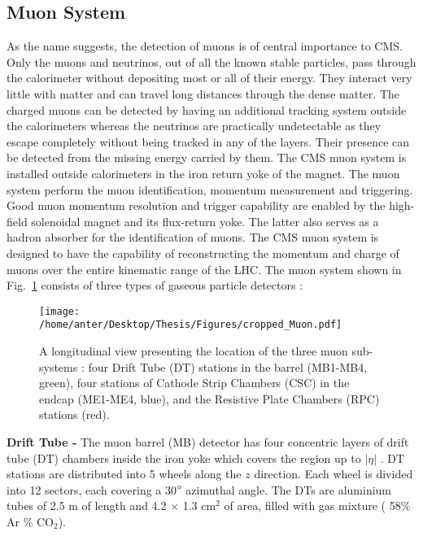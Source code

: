 \subsection{Muon System}
As the name suggests, the detection of muons is of central importance to CMS. Only the muons and neutrinos, out of all the known stable particles, pass through the calorimeter without depositing most or all of their energy. They interact very little with matter and can travel long distances through the dense matter. The charged muons can be detected by having an additional tracking system outside the calorimeters whereas the neutrinos are practically undetectable as they escape completely without being tracked in any of the layers. Their presence can be detected from the missing energy carried by them. The CMS muon system is installed outside calorimeters in the iron return yoke of the magnet. The muon system perform the muon identification, momentum measurement and triggering. Good muon momentum resolution and trigger capability are enabled by the high-field solenoidal magnet and its flux-return yoke. The latter also serves as a hadron absorber for the identification of muons. The CMS muon system is designed to have the capability of reconstructing the momentum and charge of muons over the entire kinematic range of the LHC. The muon system shown in Fig.~\ref{fig:muon} consists of three types of gaseous particle detectors : \\ \newline
\begin{figure}[!h]
\begin{center}
\vspace*{3mm} 
\hspace*{-5mm}
\texttt{[image: /home/anter/Desktop/Thesis/Figures/cropped\_Muon.pdf]}\\
\vspace*{4mm}
\caption[Muon]{A longitudinal view presenting the location of the three muon sub-systems : four Drift Tube (DT) stations in the barrel (MB1-MB4, green), four stations of Cathode Strip Chambers (CSC) in the endcap (ME1-ME4, blue), and the Resistive Plate Chambers (RPC) stations (red)\footnotemark.}
\label{fig:muon}
\end{center}
\end{figure}
{\bf Drift Tube -} 
The muon barrel (MB) detector has four concentric layers of drift tube (DT) chambers inside the iron yoke which covers the region up to $|\eta|$ . DT stations are distributed into 5 wheels along the $z$ direction. Each wheel is divided into 12 sectors, each covering a 30$\degree$ azimuthal angle. The DTs are aluminium tubes of 2.5 m of length and 4.2 $\times$ 1.3 cm$^{2}$ of area, filled with gas mixture ( 58\% Ar  \% CO$_{2}$). \\ \newline {}
